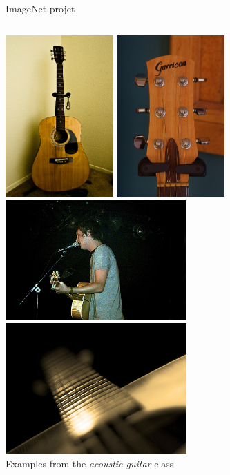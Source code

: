 \documentclass[xcolor=pdftex,dvipsnames,table,mathserif]{beamer}
\begin{document}
\begin{frame}{ImageNet projet}

  \begin{columns}
    \begin{column}{.5\textwidth}
      \centering
      \includegraphics[width=0.31\textwidth]{ilsvrc_guitar2}\hspace{0.1em}
      \includegraphics[width=0.31\textwidth]{ilsvrc_guitar3}\\
      \includegraphics[width=0.52\textwidth]{ilsvrc_guitar1}\\
      \includegraphics[width=0.52\textwidth]{ilsvrc_guitar4}\\
      Examples from the \emph{acoustic guitar} class


\end{column}
\end{columns}
\end{frame}
\end{document}
